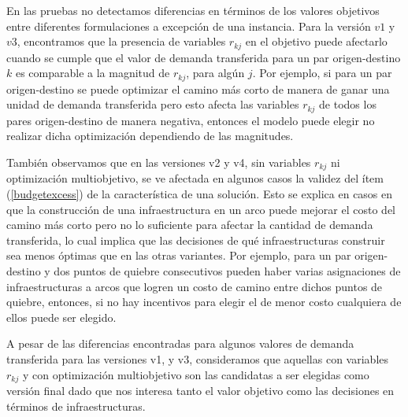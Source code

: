 \documentclass{article}
\begin{document}
  En las pruebas no detectamos diferencias en términos de los valores objetivos entre diferentes formulaciones a excepción de una instancia. Para la versión $v1$ y $v3$, encontramos que la presencia de variables $r_{kj}$ en el objetivo puede afectarlo cuando se cumple que el valor de demanda transferida para un par origen-destino $k$ es comparable a la magnitud de $r_{kj}$, para algún $j$. Por ejemplo, si para un par origen-destino se puede optimizar el camino más corto de manera de ganar una unidad de demanda transferida pero esto afecta las variables $r_{kj}$ de todos los pares origen-destino de manera negativa, entonces el modelo puede elegir no realizar dicha optimización dependiendo de las magnitudes.

  También observamos que en las versiones v2 y v4, sin variables $r_{kj}$ ni optimización multiobjetivo, se ve afectada en algunos casos la validez del ítem (\ref{budgetexcess}) de la característica de una solución. Esto se explica en casos en que la construcción de una infraestructura en un arco puede mejorar el costo del camino más corto pero no lo suficiente para afectar la cantidad de demanda transferida, lo cual implica que las decisiones de qué infraestructuras construir sea menos óptimas que en las otras variantes. Por ejemplo, para un par origen-destino y dos puntos de quiebre consecutivos pueden haber varias asignaciones de infraestructuras a arcos que logren un costo de camino entre dichos puntos de quiebre, entonces, si no hay incentivos para elegir el de menor costo cualquiera de ellos puede ser elegido.

  A pesar de las diferencias encontradas para algunos valores de demanda transferida para las versiones v1, y v3, consideramos que aquellas con variables $r_{kj}$ y con optimización multiobjetivo son las candidatas a ser elegidas como versión final dado que nos interesa tanto el valor objetivo como las decisiones en términos de infraestructuras.
\end{document}

